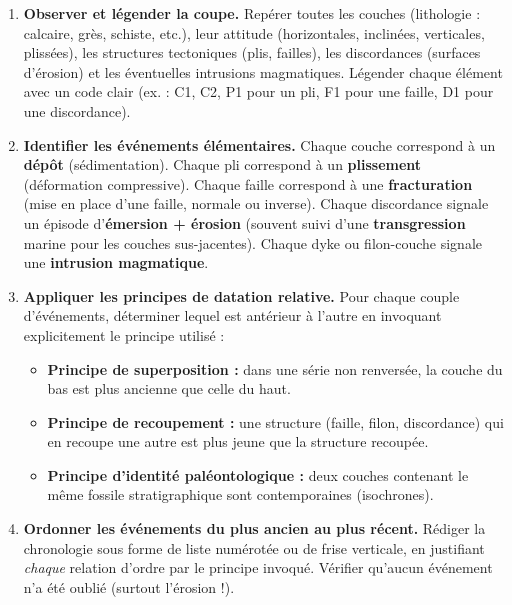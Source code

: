 \documentclass[11pt]{article}
\begin{document}
\begin{methode}
\begin{enumerate}
    \item \textbf{Observer et légender la coupe.} Repérer toutes les couches (lithologie : calcaire, grès, schiste, etc.), leur attitude (horizontales, inclinées, verticales, plissées), les structures tectoniques (plis, failles), les discordances (surfaces d'érosion) et les éventuelles intrusions magmatiques. Légender chaque élément avec un code clair (ex. : C1, C2, P1 pour un pli, F1 pour une faille, D1 pour une discordance).
    \item \textbf{Identifier les événements élémentaires.} Chaque couche correspond à un \textbf{dépôt} (sédimentation). Chaque pli correspond à un \textbf{plissement} (déformation compressive). Chaque faille correspond à une \textbf{fracturation} (mise en place d'une faille, normale ou inverse). Chaque discordance signale un épisode d'\textbf{émersion + érosion} (souvent suivi d'une \textbf{transgression} marine pour les couches sus-jacentes). Chaque dyke ou filon-couche signale une \textbf{intrusion magmatique}.
    \item \textbf{Appliquer les principes de datation relative.} Pour chaque couple d'événements, déterminer lequel est antérieur à l'autre en invoquant explicitement le principe utilisé :
    \begin{itemize}
        \item \textbf{Principe de superposition :} dans une série non renversée, la couche du bas est plus ancienne que celle du haut.
        \item \textbf{Principe de recoupement :} une structure (faille, filon, discordance) qui en recoupe une autre est plus jeune que la structure recoupée.
        \item \textbf{Principe d'identité paléontologique :} deux couches contenant le même fossile stratigraphique sont contemporaines (isochrones).
    \end{itemize}
    \item \textbf{Ordonner les événements du plus ancien au plus récent.} Rédiger la chronologie sous forme de liste numérotée ou de frise verticale, en justifiant \emph{chaque} relation d'ordre par le principe invoqué. Vérifier qu'aucun événement n'a été oublié (surtout l'érosion !).
\end{enumerate}
\end{methode}
\end{document}
